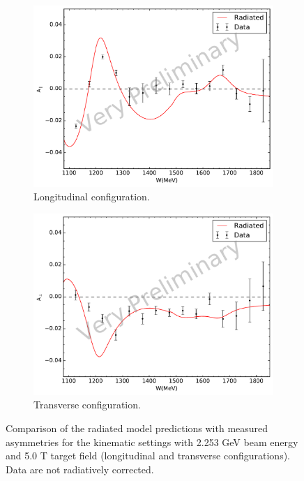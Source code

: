 \begin{figure}[p!]
  \centering
  \begin{subfigure}[t]{0.79\textwidth}
    \includegraphics[width=\textwidth]{figs/asymmetry-data-model-22535000.pdf}
    \caption{Longitudinal configuration. \label{C8S2F4a}}
  \end{subfigure}
  \begin{subfigure}[t]{0.79\textwidth}
    \includegraphics[width=\textwidth]{figs/asymmetry-data-model-22535090.pdf}
    \caption{Transverse configuration. \label{C8S2F4b}}
  \end{subfigure}
  \caption[Asymmetries with $E=2.253$ GeV and $B=5.0$ T.]{Comparison of the radiated model predictions with measured asymmetries for the kinematic settings with 2.253 GeV beam energy and 5.0 T target field (longitudinal and transverse configurations). Data are not radiatively corrected. \label{C8S2F4}}
\end{figure}

